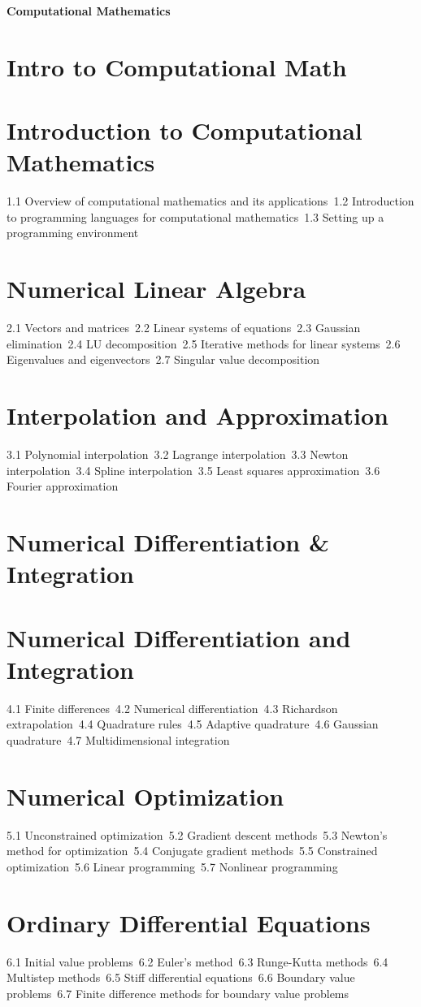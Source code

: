 {\LARGE \bf{Computational Mathematics}}
\section{Intro to Computational Math}
\section{Introduction to Computational Mathematics}
1.1 Overview of computational mathematics and its applications\
1.2 Introduction to programming languages for computational mathematics\
1.3 Setting up a programming environment\
\section{Numerical Linear Algebra}
2.1 Vectors and matrices\
2.2 Linear systems of equations\
2.3 Gaussian elimination\
2.4 LU decomposition\
2.5 Iterative methods for linear systems\
2.6 Eigenvalues and eigenvectors\
2.7 Singular value decomposition\
\section{Interpolation and Approximation}
3.1 Polynomial interpolation\
3.2 Lagrange interpolation\
3.3 Newton interpolation\
3.4 Spline interpolation\
3.5 Least squares approximation\
3.6 Fourier approximation\
\section{Numerical Differentiation \& Integration}
\section{Numerical Differentiation and Integration}
4.1 Finite differences\
4.2 Numerical differentiation\
4.3 Richardson extrapolation\
4.4 Quadrature rules\
4.5 Adaptive quadrature\
4.6 Gaussian quadrature\
4.7 Multidimensional integration\
\section{Numerical Optimization}
5.1 Unconstrained optimization\
5.2 Gradient descent methods\
5.3 Newton's method for optimization\
5.4 Conjugate gradient methods\
5.5 Constrained optimization\
5.6 Linear programming\
5.7 Nonlinear programming\
\section{Ordinary Differential Equations}
6.1 Initial value problems\
6.2 Euler's method\
6.3 Runge-Kutta methods\
6.4 Multistep methods\
6.5 Stiff differential equations\
6.6 Boundary value problems\
6.7 Finite difference methods for boundary value problems\
